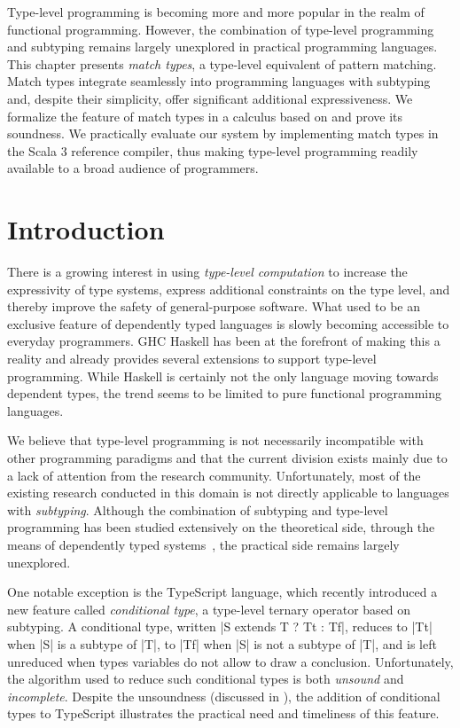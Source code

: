 Type-level programming is becoming more and more popular in the realm of functional programming.
However, the combination of type-level programming and subtyping remains largely unexplored in practical programming languages.
This chapter presents \emph{match types}, a type-level equivalent of pattern matching.
Match types integrate seamlessly into programming languages with subtyping and, despite their simplicity, offer significant additional expressiveness.
We formalize the feature of match types in a calculus based on \SystemFsub and prove its soundness.
We practically evaluate our system by implementing match types in the Scala 3 reference compiler, thus making type-level programming readily available to a broad audience of programmers.

\section{Introduction}
\label{sec:introduction}

There is a growing interest in using \emph{type-level computation} to increase the expressivity of type systems, express additional constraints on the type level, and thereby improve the safety of general-purpose software.
What used to be an exclusive feature of dependently typed languages is slowly becoming accessible to everyday programmers.
GHC Haskell has been at the forefront of making this a reality and already provides several extensions to support type-level programming.
While Haskell is certainly not the only language moving towards dependent types, the trend seems to be limited to pure functional programming languages.

We believe that type-level programming is not necessarily incompatible with other programming paradigms and that the current division exists mainly due to a lack of attention from the research community.
Unfortunately, most of the existing research conducted in this domain is not directly applicable to languages with \emph{subtyping}.
Although the combination of subtyping and type-level programming has been studied extensively on the theoretical side, through the means of dependently typed systems~\citep{aspinall1994subtyping, zwanenburg1999pure, stone2000deciding, courant2003strong, hutchins2010pure, yang2017unifying}, the practical side remains largely unexplored.

One notable exception is the TypeScript language, which recently introduced a new feature called \emph{conditional type}, a type-level ternary operator based on subtyping.
A conditional type, written |S extends T ? Tt : Tf|, reduces to |Tt| when |S| is a subtype of |T|, to |Tf| when |S| is not a subtype of |T|, and is left unreduced when types variables do not allow to draw a conclusion. Unfortunately, the algorithm used to reduce such conditional types is both \emph{unsound} and \emph{incomplete}.
Despite the unsoundness (discussed in ), the addition of conditional types to TypeScript illustrates the practical need and timeliness of this feature.

